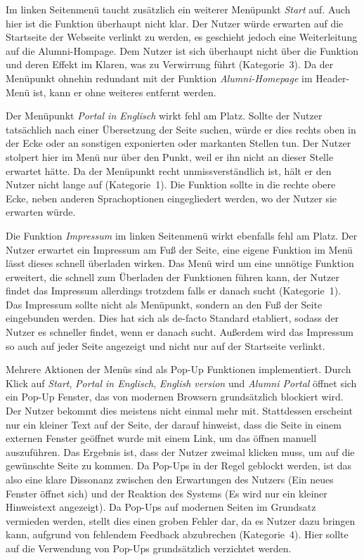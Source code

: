 {Im linken Seitenmenü taucht zusätzlich ein weiterer Menüpunkt \emph{Start} auf. Auch hier ist die Funktion überhaupt nicht klar. Der Nutzer würde erwarten auf die Startseite der Webseite verlinkt zu werden, es geschieht jedoch eine Weiterleitung auf die Alumni-Hompage. 
}
{Dem Nutzer ist sich überhaupt nicht über die Funktion und deren Effekt im Klaren, was zu Verwirrung führt (Kategorie~3).
}
{Da der Menüpunkt ohnehin redundant mit der Funktion \emph{Alumni-Homepage} im Header-Menü ist, kann er ohne weiteres entfernt werden.
}\label{prob:start:pkt:start}

{Der Menüpunkt \emph{Portal in Englisch} wirkt fehl am Platz. Sollte der Nutzer tatsächlich nach einer Übersetzung der Seite suchen, würde er dies rechts oben in der Ecke oder an sonstigen exponierten oder markanten Stellen tun. 
Der Nutzer stolpert hier im Menü nur über den Punkt, weil er ihn nicht an dieser Stelle erwartet hätte.
}
{Da der Menüpunkt recht unmissverständlich ist, hält er den Nutzer nicht lange auf (Kategorie~1).
}
{Die Funktion sollte in die rechte obere Ecke, neben anderen Sprachoptionen eingegliedert werden, wo der Nutzer sie erwarten würde.
}\label{prob:start:pkt:eng}

{Die Funktion \emph{Impressum} im linken Seitenmenü wirkt ebenfalls fehl am Platz. Der Nutzer erwartet ein Impressum am Fuß der Seite, eine eigene Funktion im Menü lässt dieses schnell überladen wirken.
}
{Das Menü wird um eine unnötige Funktion erweitert, die schnell zum Überladen der Funktionen führen kann, der Nutzer findet das Impressum allerdings trotzdem falls er danach sucht (Kategorie~1).
}
{Das Impressum sollte nicht als Menüpunkt, sondern an den Fuß der Seite eingebunden werden. Dies hat sich als de-facto Standard etabliert, sodass der Nutzer es schneller findet, wenn er danach sucht.
Außerdem wird das Impressum so auch auf jeder Seite angezeigt und nicht nur auf der Startseite verlinkt. 
}\label{prob:start:pkt:imp}

{Mehrere Aktionen der Menüs sind als Pop-Up Funktionen implementiert. Durch Klick auf \emph{Start}, \emph{Portal in Englisch}, \emph{English version} und \emph{Alumni Portal} öffnet sich ein Pop-Up Fenster, das von modernen Browsern grundsätzlich blockiert wird. 
Der Nutzer bekommt dies meistens nicht einmal mehr mit. Stattdessen erscheint nur ein kleiner Text auf der Seite, der darauf hinweist, dass die Seite in einem externen Fenster geöffnet wurde mit einem Link, um das öffnen manuell auszuführen.
Das Ergebnis ist, dass der Nutzer zweimal klicken muss, um auf die gewünschte Seite zu kommen.
}
{Da Pop-Ups in der Regel geblockt werden, ist das also eine klare Dissonanz zwischen den Erwartungen des Nutzers (Ein neues Fenster öffnet sich) und der Reaktion des Systems (Es wird nur ein kleiner Hinweistext angezeigt). Da Pop-Ups auf modernen Seiten im Grundsatz vermieden werden, stellt dies einen groben Fehler dar, da es Nutzer dazu bringen kann, aufgrund von fehlendem Feedback abzubrechen (Kategorie~4).
}
{Hier sollte auf die Verwendung von Pop-Ups grundsätzlich verzichtet werden.
}\label{prob:start:popup}

